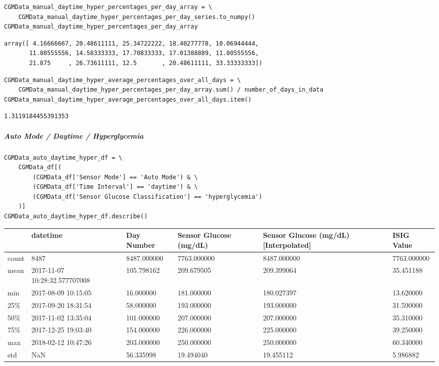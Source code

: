 \begin{verbatim}
CGMData_manual_daytime_hyper_percentages_per_day_array = \
    CGMData_manual_daytime_hyper_percentages_per_day_series.to_numpy()
CGMData_manual_daytime_hyper_percentages_per_day_array
\end{verbatim}

\begin{verbatim}
array([ 4.16666667, 20.48611111, 25.34722222, 18.40277778, 10.06944444,
       11.80555556, 14.58333333, 17.70833333, 17.01388889, 11.80555556,
       21.875     , 26.73611111, 12.5       , 20.48611111, 33.33333333])
\end{verbatim}

\begin{verbatim}
CGMData_manual_daytime_hyper_average_percentages_over_all_days = \
    CGMData_manual_daytime_hyper_percentages_per_day_array.sum() / number_of_days_in_data
CGMData_manual_daytime_hyper_average_percentages_over_all_days.item()
\end{verbatim}

\begin{verbatim}
1.3119184455391353
\end{verbatim}

\subparagraph{Auto Mode / Daytime / Hyperglycemia}

\begin{verbatim}
CGMData_auto_daytime_hyper_df = \
    CGMData_df[(
        (CGMData_df['Sensor Mode'] == 'Auto Mode') & \
        (CGMData_df['Time Interval'] == 'daytime') & \
        (CGMData_df['Sensor Glucose Classification'] == 'hyperglycemia')
    )]
CGMData_auto_daytime_hyper_df.describe()
\end{verbatim}

\bigskip\noindent
\begin{tabular}{p{}p{}p{}p{}p{}p{}}
\toprule
 & datetime & Day Number & Sensor Glucose (mg/dL) & Sensor Glucose (mg/dL) [Interpolated] & ISIG Value \\
\hline
count & 8487 & 8487.000000 & 7763.000000 & 8487.000000 & 7763.000000 \\
\hline
mean & 2017-11-07 10:28:32.577707008 & 105.798162 & 209.679505 & 209.399064 & 35.451188 \\
\hline
min & 2017-08-09 10:15:05 & 16.000000 & 181.000000 & 180.027397 & 13.620000 \\
\hline
25\% & 2017-09-20 18:31:54 & 58.000000 & 193.000000 & 193.000000 & 31.590000 \\
\hline
50\% & 2017-11-02 13:35:04 & 101.000000 & 207.000000 & 207.000000 & 35.310000 \\
\hline
75\% & 2017-12-25 19:03:40 & 154.000000 & 226.000000 & 225.000000 & 39.250000 \\
\hline
max & 2018-02-12 10:47:26 & 203.000000 & 250.000000 & 250.000000 & 60.340000 \\
\hline
std & NaN & 56.335998 & 19.494040 & 19.455112 & 5.986882 \\
\hline
\bottomrule
\end{tabular}

